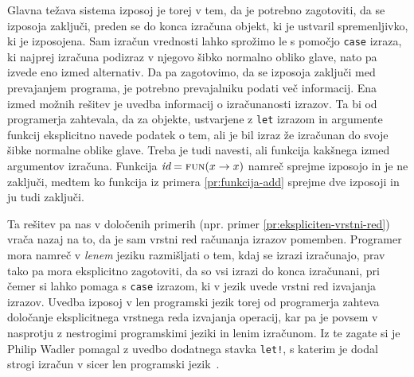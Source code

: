 Glavna težava sistema izposoj je torej v tem, da je potrebno zagotoviti, da se izposoja zaključi, preden se do konca izračuna objekt, ki je ustvaril spremenljivko, ki je izposojena. Sam izračun vrednosti lahko sprožimo le s pomočjo \texttt{case} izraza, ki najprej izračuna podizraz v njegovo šibko normalno obliko glave, nato pa izvede eno izmed alternativ. Da pa zagotovimo, da se izposoja zaključi med prevajanjem programa, je potrebno prevajalniku podati več informacij. Ena izmed možnih rešitev je uvedba informacij o izračunanosti izrazov. Ta bi od programerja zahtevala, da za objekte, ustvarjene z \texttt{let} izrazom in argumente funkcij eksplicitno navede podatek o tem, ali je bil izraz že izračunan do svoje šibke normalne oblike glave. Treba je tudi navesti, ali funkcija kakšnega izmed argumentov izračuna. Funkcija $\var{id} = \object{FUN}(x \to x)$ namreč sprejme izposojo in je ne zaključi, medtem ko funkcija  iz primera \ref{pr:funkcija-add} sprejme dve izposoji in ju tudi zaključi.

Ta rešitev pa nas v določenih primerih (npr. primer \ref{pr:ekspliciten-vrstni-red}) vrača nazaj na to, da je sam vrstni red računanja izrazov pomemben. Programer mora namreč v \emph{lenem} jeziku razmišljati o tem, kdaj se izrazi izračunajo, prav tako pa mora eksplicitno zagotoviti, da so vsi izrazi do konca izračunani, pri čemer si lahko pomaga s \texttt{case} izrazom, ki v jezik uvede vrstni red izvajanja izrazov. Uvedba izposoj v len programski jezik torej od programerja zahteva določanje eksplicitnega vrstnega reda izvajanja operacij, kar pa je povsem v nasprotju z nestrogimi programskimi jeziki in lenim izračunom. Iz te zagate si je Philip Wadler pomagal z uvedbo dodatnega stavka \texttt{let!}, s katerim je dodal strogi izračun v sicer len programski jezik~\cite{wadler1990linear}.


